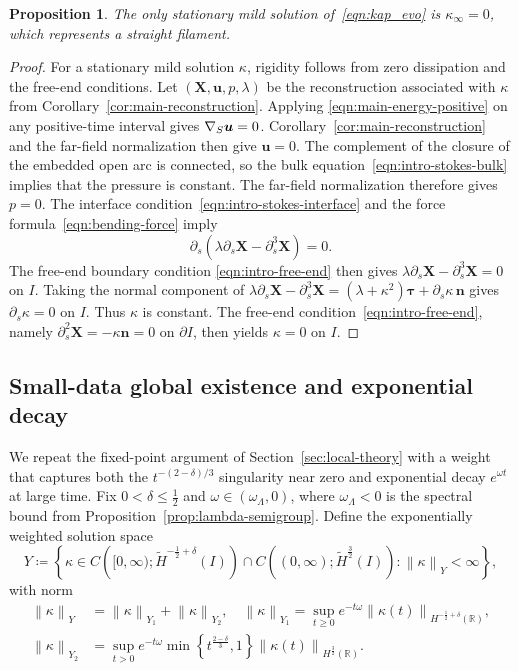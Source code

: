 \documentclass[11pt,reqno]{amsart}
\theoremstyle{plain}
\newtheorem{proposition}[theorem]{Proposition}
\theoremstyle{definition}
\numberwithin{equation}{section}
\newcommand{\paren}[1]{\left(#1\right)}
\newcommand{\p}{\partial}
\newcommand{\grad}[1]{\nabla #1}
\newcommand{\wt}[1]{\widetilde{#1}}
\newcommand{\bm}[1]{\boldsymbol{#1}}
\newcommand{\norm}[1]{\left\lVert #1 \right\rVert}
\newcommand{\R}{\mathbb{R}}
\newcommand{\thi}[1]{\wt H^{#1}(I)}
\newcommand{\hr}[1]{H^{#1}(\R)}
\begin{document}
\begin{proposition}\label{prop:std-stt}
The only stationary mild solution of~\eqref{eqn:kap_evo} is
$\kappa_\infty=0$, which represents a straight filament.
\end{proposition}
\begin{proof}
For a stationary mild solution $\kappa$, rigidity follows from zero
dissipation and the free-end conditions.
Let $(\bm X,\bm u,p,\lambda)$ be the reconstruction associated with $\kappa$
from Corollary~\ref{cor:main-reconstruction}. Applying
\eqref{eqn:main-energy-positive} on any positive-time interval gives
$\grad_S\bm u=0$. Corollary~\ref{cor:main-reconstruction} and the far-field
normalization then give $\bm u=0$. The complement of the closure of the embedded open arc
is connected, so the bulk equation~\eqref{eqn:intro-stokes-bulk} implies that
the pressure is constant. The far-field normalization therefore gives $p=0$.
The interface condition~\eqref{eqn:intro-stokes-interface} and the force
formula~\eqref{eqn:bending-force} imply
\begin{equation}
    \p_s\paren{\lambda\p_s\bm X-\p_s^3\bm X}=0.
\end{equation}
The free-end boundary condition \eqref{eqn:intro-free-end} then gives
$\lambda\p_s\bm X-\p_s^3\bm X=0$ on $I$. Taking the normal component of
$\lambda\p_s\bm X-\p_s^3\bm X=(\lambda+\kappa^2)\bm\tau+\p_s\kappa\,\bm n$
gives $\p_s\kappa=0$ on $I$. Thus $\kappa$ is constant. The
free-end condition~\eqref{eqn:intro-free-end}, namely $\p_s^2\bm X=-\kappa\bm n=0$ on $\p I$,
then yields $\kappa=0$ on $I$.
\end{proof}

\subsection{Small-data global existence and exponential decay}
\label{subsec:small-data-proof}

We repeat the fixed-point argument of Section~\ref{sec:local-theory}
with a weight that captures both the $t^{-(2-\delta)/3}$ singularity
near zero and exponential decay $e^{\omega t}$ at large time.
Fix $0<\delta\le\frac12$ and $\omega\in(\omega_\Lambda,0)$, where
$\omega_\Lambda<0$ is the spectral bound from
Proposition~\ref{prop:lambda-semigroup}. Define the exponentially weighted
solution space
\begin{equation}\label{eqn:Y-intro}
    Y
    \coloneqq
    \left\{
    \kappa\in C\paren{[0,\infty);\thi{-\frac12+\delta}}
    \cap C\paren{(0,\infty);\thi{\frac32}}:
    \norm{\kappa}_Y<\infty
    \right\},
\end{equation}
with norm
\begin{equation}\label{eqn:Y-norm-intro}
\begin{aligned}
    \norm{\kappa}_Y
    &=\norm{\kappa}_{Y_1}+\norm{\kappa}_{Y_2},\quad
    \norm{\kappa}_{Y_1}
    =\sup_{t\ge0}e^{-t\omega}
    \norm{\kappa(t)}_{\hr{-\frac12+\delta}},\\
    \norm{\kappa}_{Y_2}
    &=\sup_{t>0}e^{-t\omega}
    \min\left\{t^{\frac{2-\delta}{3}},1\right\}
    \norm{\kappa(t)}_{\hr{\frac32}}.
\end{aligned}
\end{equation}
\end{document}
